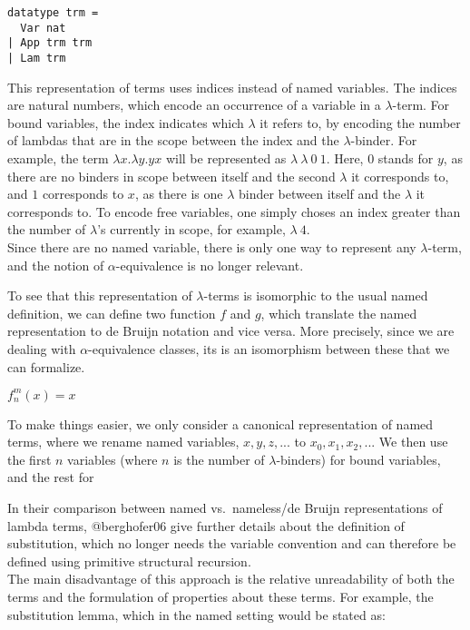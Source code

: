 \begin{verbatim}
datatype trm =
  Var nat
| App trm trm
| Lam trm
\end{verbatim}

This representation of terms uses indices instead of named variables.
The indices are natural numbers, which encode an occurrence of a
variable in a \(\lambda\)-term. For bound variables, the index indicates
which \(\lambda\) it refers to, by encoding the number of lambdas that
are in the scope between the index and the \(\lambda\)-binder. For
example, the term \(\lambda x.\lambda y. yx\) will be represented as
\(\lambda\ \lambda\ 0\ 1\). Here, 0 stands for \(y\), as there are no
binders in scope between itself and the second \(\lambda\) it
corresponds to, and \(1\) corresponds to \(x\), as there is one
\(\lambda\) binder between itself and the \(\lambda\) it corresponds to.
To encode free variables, one simply choses an index greater than the
number of \(\lambda\)'s currently in scope, for example,
\(\lambda\ 4\).\\
Since there are no named variable, there is only one way to represent
any \(\lambda\)-term, and the notion of \(\alpha\)-equivalence is no
longer relevant.

To see that this representation of \(\lambda\)-terms is isomorphic to
the usual named definition, we can define two function \(f\) and \(g\),
which translate the named representation to de Bruijn notation and vice
versa. More precisely, since we are dealing with \(\alpha\)-equivalence
classes, its is an isomorphism between these that we can formalize.

\begin{math}
f_n^m(x) = x
\end{math}

To make things easier, we only consider a canonical representation of
named terms, where we rename named variables, \(x, y, z,...\) to
\(x_0,x_1,x_2,...\) We then use the first \(n\) variables (where \(n\)
is the number of \(\lambda\)-binders) for bound variables, and the rest
for

In their comparison between named vs.~nameless/de Bruijn representations
of lambda terms, @berghofer06 give further details about the definition
of substitution, which no longer needs the variable convention and can
therefore be defined using primitive structural recursion.\\
The main disadvantage of this approach is the relative unreadability of
both the terms and the formulation of properties about these terms. For
example, the substitution lemma, which in the named setting would be
stated as:

